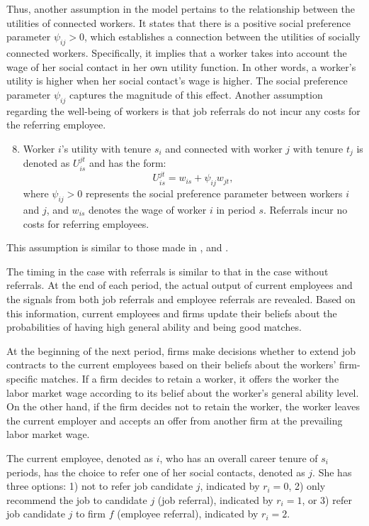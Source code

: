 \documentclass[12pt]{article}
\begin{document}
Thus, another assumption in the model pertains to the relationship between the utilities of connected workers. It states that there is a positive social preference parameter $\psi_{ij} > 0$, which establishes a connection between the utilities of socially connected workers. Specifically, it implies that a worker takes into account the wage of her social contact in her own utility function. In other words, a worker's utility is higher when her social contact's wage is higher. The social preference parameter $\psi_{ij}$ captures the magnitude of this effect. Another assumption regarding the well-being of workers is that job referrals do not incur any costs for the referring employee.
\begin{enumerate}[label={A}{\arabic*}.]
\setcounter{enumi}{7}
    \item Worker $i$'s utility with tenure $s_i$ and connected with worker $j$ with tenure $t_j$ is denoted as $U_{is}^{jt}$ and has the form:
    \begin{equation}\label{eq:utility_worker}
        U_{is}^{jt} = w_{is} + \psi_{ij}w_{jt},
    \end{equation}
    where $\psi_{ij} > 0$ represents the social preference parameter between workers $i$ and $j$, and $w_{is}$ denotes the wage of worker $i$ in period $s$. Referrals incur no costs for referring employees.
\end{enumerate}
This assumption is similar to those made in \cite{bandiera2005social}, \cite{bandiera2009social} and \cite{friebel2023employee}. 

The timing in the case with referrals is similar to that in the case without referrals. At the end of each period, the actual output of current employees and the signals from both job referrals and employee referrals are revealed. Based on this information, current employees and firms update their beliefs about the probabilities of having high general ability and being good matches.

At the beginning of the next period, firms make decisions whether to extend job contracts to the current employees based on their beliefs about the workers' firm-specific matches. If a firm decides to retain a worker, it offers the worker the labor market wage according to its belief about the worker's general ability level. On the other hand, if the firm decides not to retain the worker, the worker leaves the current employer and accepts an offer from another firm at the prevailing labor market wage.

The current employee, denoted as $i$, who has an overall career tenure of $s_i$ periods, has the choice to refer one of her social contacts, denoted as $j$. She has three options: 1) not to refer job candidate $j$, indicated by $r_i = 0$, 2) only recommend the job to candidate $j$ (job referral), indicated by $r_i = 1$, or 3) refer job candidate $j$ to firm $f$ (employee referral), indicated by $r_i = 2$.
\end{document}
